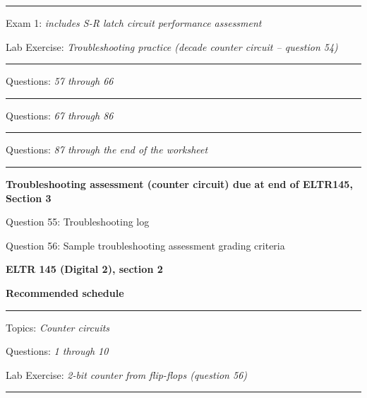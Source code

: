 \vskip 10pt
\hrule \vskip 5pt
\noindent
{}

\hskip 10pt Exam 1: {\it includes S-R latch circuit performance assessment}
 
\hskip 10pt Lab Exercise: {\it Troubleshooting practice (decade counter circuit -- question 54)}
 
\vskip 10pt
\hrule \vskip 5pt
\noindent
{}

\hskip 10pt Questions: {\it 57 through 66}
 
\vskip 10pt
\hrule \vskip 5pt
\noindent
{}

\hskip 10pt Questions: {\it 67 through 86}
 
\vskip 10pt
\hrule \vskip 5pt
\noindent
{}

\hskip 10pt Questions: {\it 87 through the end of the worksheet}
 
\vskip 10pt
\hrule \vskip 5pt
\noindent
{}

\hskip 10pt {\bf Troubleshooting assessment (counter circuit) due at end of ELTR145, Section 3}

\hskip 10pt Question 55: Troubleshooting log
 
\hskip 10pt Question 56: Sample troubleshooting assessment grading criteria
 
\vskip 10pt








\vfil \eject

\centerline{\bf ELTR 145 (Digital 2), section 2} \bigskip 
 
\vskip 10pt

\noindent
{\bf Recommended schedule}

\vskip 5pt

\hrule \vskip 5pt
\noindent
{}

\hskip 10pt Topics: {\it Counter circuits}
 
\hskip 10pt Questions: {\it 1 through 10}
 
\hskip 10pt Lab Exercise: {\it 2-bit counter from flip-flops (question 56)}
 
\vskip 10pt
\hrule \vskip 5pt
\noindent
{}

